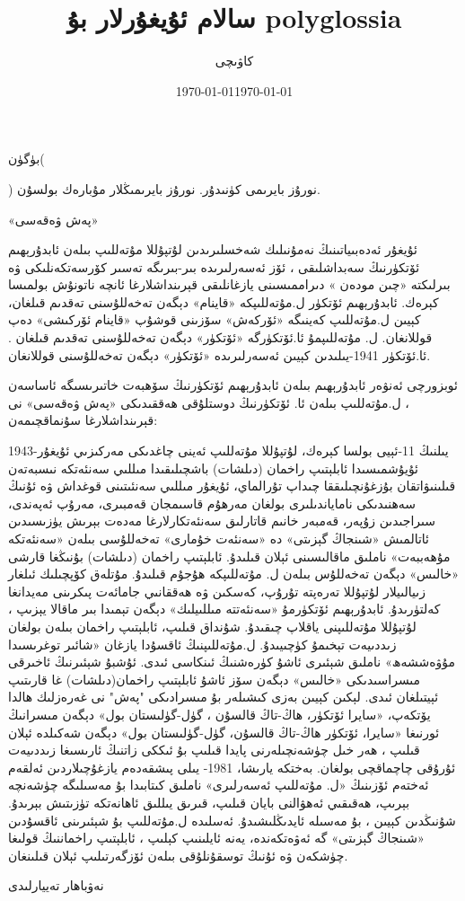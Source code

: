 \documentclass{article}
\title{سالام ئۇيغۇرلار بۇ polyglossia}
\author{كاۋىچى}
\date{\today}
\begin{document}
\maketitle

بۈگۈن(\date{\today}) نورۇز بايرىمى كۈنىدۇر. نورۇز بايرىمىڭلار مۇبارەك بولسۇن.


«پەش ۋەقەسى»

ئۇيغۇر ئەدەبىياتىنىڭ نەمۇنىلىك شەخسلىرىدىن لۇتپۇللا مۇتەللىپ بىلەن ئابدۇرېھىم ئۆتكۈرنىڭ سەبداشلىقى ، ئۆز ئەسەرلىرىدە بىر-بىرىگە تەسىر كۆرسەتكەنلىكى ۋە بىرلىكتە «چىن مودەن » دىراممىسىنى يازغانلىقى قېرىنداشلارغا ئانچە ناتونۇش بولمىسا كېرەك. ئابدۇرېھىم ئۆتكۈر ل.مۇتەللىپكە «قاينام» دېگەن تەخەللۇسنى تەقدىم قىلغان، كېيىن ل.مۇتەللىپ كەينىگە «ئۆركەش» سۆزىنى قوشۇپ «قاينام ئۆركىشى» دەپ قوللانغان. ل. مۇتەللىپمۇ ئا.ئۆتكۈرگە «ئۆتكۈر» دېگەن تەخەللۇسنى تەقدىم قىلغان . ئا.ئۆتكۈر 1941-يىلىدىن كېيىن ئەسەرلىرىدە «ئۆتكۈر» دېگەن تەخەللۇسنى قوللانغان.

ئوبزورچى ئەنۋەر ئابدۇرېھىم بىلەن ئابدۇرېھىم ئۆتكۈرنىڭ سۆھبەت خاتىرىسىگە ئاساسەن ، ل.مۇتەللىپ بىلەن ئا. ئۆتكۈرنىڭ دوستلۇقى ھەققىدىكى «پەش ۋەقەسى» نى قېرىنداشلارغا سۇنماقچىمەن:

1943-يىلنىڭ 11-ئېيى بولسا كېرەك، لۇتپۇللا مۇتەللىپ ئەينى چاغدىكى مەركىزىي ئۇيغۇر ئۇيۇشمىسىدا ئابلېتىپ راخمان (دىلشات) باشچىلىقىدا مىللىي سەنئەتكە نىسبەتەن قىلىنىۋاتقان بۇزغۇنچىلىققا چىداپ تۇرالماي، ئۇيغۇر مىللىي سەنئىتىنى قوغداش ۋە ئۇنىڭ سەھنىدىكى ناماياندىلىرى بولغان مەرھۇم قاسىمجان قەمبىرى، مەرۇپ ئەپەندى، سىراجىدىن زۇپەر، قەمبەر خانىم قاتارلىق سەنئەتكارلارغا مەدەت بېرىش يۈزىسىدىن ئاتالمىش «شىنجاڭ گېزىتى» دە «سەنئەت خۇمارى» تەخەللۇسى بىلەن «سەنئەتكە مۇھەببەت» ناملىق ماقالىسىنى ئېلان قىلىدۇ. ئابلېتىپ راخمان (دىلشات) بۇنىڭغا قارشى «خالىس» دېگەن تەخەللۇس بىلەن ل. مۇتەللىپكە ھۇجۇم قىلىدۇ. مۇتلەق كۆپچىلىك ئىلغار زىيالىيلار لۇتپۇللا تەرەپتە تۇرۇپ، كەسكىن ۋە ھەققانىي جامائەت پىكرىنى مەيدانغا كەلتۈرىدۇ. ئابدۇرېھىم ئۆتكۈرمۇ «سەنئەتتە مىللىيلىك» دېگەن تېمىدا بىر ماقالا يېزىپ ، لۇتپۇللا مۇتەللىپنى ياقلاپ چىقىدۇ. شۇنداق قىلىپ، ئابلېتىپ راخمان بىلەن بولغان زىددىيەت تېخىمۇ كۈچىيىدۇ. ل.مۇتەللىپنىڭ ئاقسۇدا يازغان «شائىر توغرىسىدا مۇۋەششەھ» ناملىق شېئىرى ئاشۇ كۈرەشنىڭ ئىنكاسى ئىدى. ئۇشبۇ شېئىرنىڭ ئاخىرقى مىسراسىدىكى «خالىس» دېگەن سۆز ئاشۇ ئابلېتىپ راخمان(دىلشات) غا قارىتىپ ئېيتىلغان ئىدى. لېكىن كېيىن بەزى كىشىلەر بۇ مىسرادىكى "پەش" نى غەرەزلىك ھالدا يۆتكەپ، «سايرا ئۆتكۈر، ھاڭ-تاڭ قالسۇن ، گۈل-گۈلىستان بول» دېگەن مىسرانىڭ ئورنىغا «سايرا، ئۆتكۈر ھاڭ-تاڭ قالسۇن، گۈل-گۈلىستان بول» دېگەن شەكىلدە ئېلان قىلىپ ، ھەر خىل چۈشەنچىلەرنى پايدا قىلىپ بۇ ئىككى زاتنىڭ ئارىسىغا زىددىيەت ئۇرۇقى چاچماقچى بولغان. بەختكە يارىشا، 1981- يىلى پىشقەدەم يازغۇچىلاردىن ئەلقەم ئەختەم ئۆزىنىڭ «ل. مۇتەللىپ ئەسەرلىرى» ناملىق كىتابىدا بۇ مەسىلىگە چۈشەنچە بېرىپ، ھەقىقىي ئەھۋالنى بايان قىلىپ، قىرىق يىللىق ئاھانەتكە تۈزىتىش بېرىدۇ. شۇنىڭدىن كېيىن ، بۇ مەسىلە ئايدىڭلىشىدۇ. ئەسلىدە ل.مۇتەللىپ بۇ شېئىرىنى ئاقسۇدىن «شىنجاڭ گېزىتى» گە ئەۋەتكەندە، يەنە ئايلىنىپ كېلىپ ، ئابلېتىپ راخماننىڭ قولىغا چۈشكەن ۋە ئۇنىڭ توسقۇنلۇقى بىلەن ئۆزگەرتىلىپ ئېلان قىلىنغان.

نەۋباھار تەييارلىدى
\end{document}
